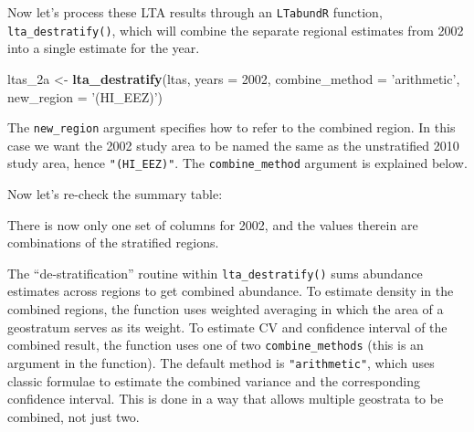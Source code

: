 \documentclass[
]{book}
\newenvironment{Shaded}{\begin{snugshade}}{\end{snugshade}}
\newcommand{\DataTypeTok}[1]{\textcolor[rgb]{0.13,0.29,0.53}{#1}}
\newcommand{\DecValTok}[1]{\textcolor[rgb]{0.00,0.00,0.81}{#1}}
\newcommand{\FloatTok}[1]{\textcolor[rgb]{0.00,0.00,0.81}{#1}}
\newcommand{\KeywordTok}[1]{\textcolor[rgb]{0.13,0.29,0.53}{\textbf{#1}}}
\newcommand{\NormalTok}[1]{#1}
\newcommand{\OperatorTok}[1]{\textcolor[rgb]{0.81,0.36,0.00}{\textbf{#1}}}
\newcommand{\OtherTok}[1]{\textcolor[rgb]{0.56,0.35,0.01}{#1}}
\newcommand{\StringTok}[1]{\textcolor[rgb]{0.31,0.60,0.02}{#1}}
\begin{document}
Now let's process these LTA results through an \texttt{LTabundR} function, \texttt{lta\_destratify()}, which will combine the separate regional estimates from 2002 into a single estimate for the year.

\begin{Shaded}
\begin{Highlighting}[]
\NormalTok{ltas_2a <-}
\StringTok{  }\KeywordTok{lta_destratify}\NormalTok{(ltas,}
               \DataTypeTok{years =} \DecValTok{2002}\NormalTok{,}
               \DataTypeTok{combine_method =} \StringTok{'arithmetic'}\NormalTok{,}
               \DataTypeTok{new_region =} \StringTok{'(HI_EEZ)'}\NormalTok{)}
\end{Highlighting}
\end{Shaded}

The \texttt{new\_region} argument specifies how to refer to the combined region. In this case we want the 2002 study area to be named the same as the unstratified 2010 study area, hence \texttt{"(HI\_EEZ)"}. The \texttt{combine\_method} argument is explained below.

Now let's re-check the summary table:

\begin{Shaded}
\end{Shaded}

There is now only one set of columns for 2002, and the values therein are combinations of the stratified regions.

The ``de-stratification'' routine within \texttt{lta\_destratify()} sums abundance estimates across regions to get combined abundance. To estimate density in the combined regions, the function uses weighted averaging in which the area of a geostratum serves as its weight. To estimate CV and confidence interval of the combined result, the function uses one of two \texttt{combine\_methods} (this is an argument in the function). The default method is \texttt{"arithmetic"}, which uses classic formulae to estimate the combined variance and the corresponding confidence interval. This is done in a way that allows multiple geostrata to be combined, not just two.
\end{document}
